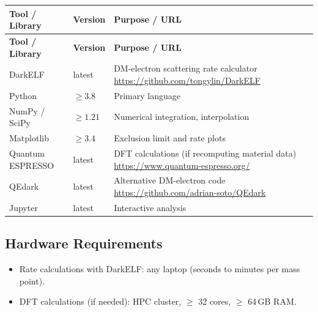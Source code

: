 \documentclass[11pt,a4paper]{article}
\begin{document}
\begin{longtable}{p{4.5cm} p{2.5cm} p{6.5cm}}
\toprule
\textbf{Tool / Library} & \textbf{Version} & \textbf{Purpose / URL} \\
\midrule
\endfirsthead
\toprule
\textbf{Tool / Library} & \textbf{Version} & \textbf{Purpose / URL} \\
\midrule
\endhead
DarkELF & latest & DM-electron scattering rate calculator \newline \url{https://github.com/tongylin/DarkELF} \\
\midrule
Python & $\geq 3.8$ & Primary language \\
\midrule
NumPy / SciPy & $\geq 1.21$ & Numerical integration, interpolation \\
\midrule
Matplotlib & $\geq 3.4$ & Exclusion limit and rate plots \\
\midrule
Quantum ESPRESSO & latest & DFT calculations (if recomputing material data) \newline \url{https://www.quantum-espresso.org/} \\
\midrule
QEdark & latest & Alternative DM-electron code \newline \url{https://github.com/adrian-soto/QEdark} \\
\midrule
Jupyter & latest & Interactive analysis \\
\bottomrule
\end{longtable}

\subsection{Hardware Requirements}
\begin{itemize}
  \item Rate calculations with DarkELF: any laptop (seconds to minutes per mass point).
  \item DFT calculations (if needed): HPC cluster, $\geq$ 32 cores, $\geq$ 64\,GB RAM.
\end{itemize}
\end{document}
